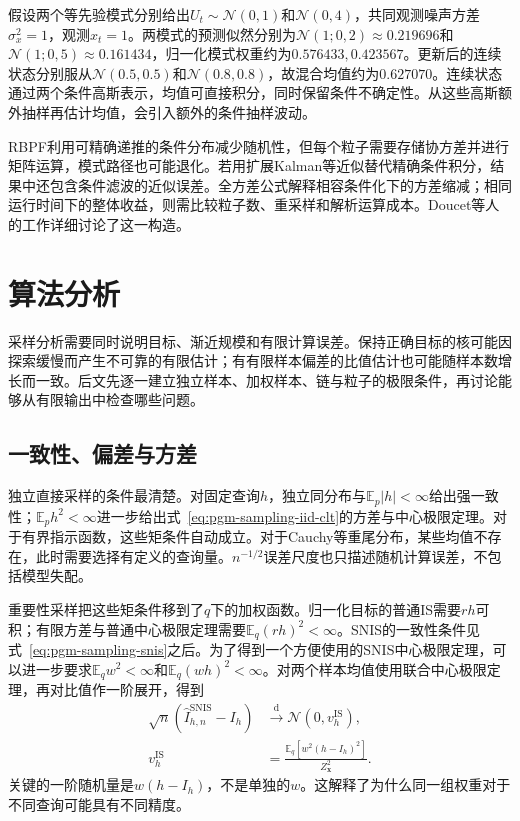 假设两个等先验模式分别给出$U_t\sim\mathcal{N}(0,1)$和$\mathcal{N}(0,4)$，共同观测噪声方差$\sigma_x^2=1$，观测$x_t=1$。两模式的预测似然分别为$\mathcal{N}(1;0,2)\approx0.219696$和$\mathcal{N}(1;0,5)\approx0.161434$，归一化模式权重约为$0.576433,0.423567$。更新后的连续状态分别服从$\mathcal{N}(0.5,0.5)$和$\mathcal{N}(0.8,0.8)$，故混合均值约为$0.627070$。连续状态通过两个条件高斯表示，均值可直接积分，同时保留条件不确定性。从这些高斯额外抽样再估计均值，会引入额外的条件抽样波动。

RBPF利用可精确递推的条件分布减少随机性，但每个粒子需要存储协方差并进行矩阵运算，模式路径也可能退化。若用扩展Kalman等近似替代精确条件积分，结果中还包含条件滤波的近似误差。全方差公式解释相容条件化下的方差缩减；相同运行时间下的整体收益，则需比较粒子数、重采样和解析运算成本。Doucet等人的工作详细讨论了这一构造。

\section{算法分析}
\label{sec:pgm-sampling-analysis}

采样分析需要同时说明目标、渐近规模和有限计算误差。保持正确目标的核可能因探索缓慢而产生不可靠的有限估计；有有限样本偏差的比值估计也可能随样本数增长而一致。后文先逐一建立独立样本、加权样本、链与粒子的极限条件，再讨论能够从有限输出中检查哪些问题。

\subsection{一致性、偏差与方差}
\label{sec:pgm-sampling-consistency}

独立直接采样的条件最清楚。对固定查询$h$，独立同分布与$\mathbb{E}_p|h|<\infty$给出强一致性；$\mathbb{E}_p h^2<\infty$进一步给出式~\eqref{eq:pgm-sampling-iid-clt}的方差与中心极限定理。对于有界指示函数，这些矩条件自动成立。对于Cauchy等重尾分布，某些均值不存在，此时需要选择有定义的查询量。$n^{-1/2}$误差尺度也只描述随机计算误差，不包括模型失配。

重要性采样把这些矩条件移到了$q$下的加权函数。归一化目标的普通IS需要$r h$可积；有限方差与普通中心极限定理需要$\mathbb{E}_q(rh)^2<\infty$。SNIS的一致性条件见式~\eqref{eq:pgm-sampling-snis}之后。为了得到一个方便使用的SNIS中心极限定理，可以进一步要求$\mathbb{E}_q w^2<\infty$和$\mathbb{E}_q(wh)^2<\infty$。对两个样本均值使用联合中心极限定理，再对比值作一阶展开，得到
\begin{equation}
  \begin{aligned}
    \sqrt n(\widehat I_{h,n}^{\mathrm{SNIS}}-I_h)
       &\xrightarrow{\mathrm{d}}\mathcal{N}(0,v_h^{\mathrm{IS}}),\\
    v_h^{\mathrm{IS}}
       &=\frac{\mathbb{E}_q[w^2(h-I_h)^2]}{Z_{\bm{x}}^2}.
  \end{aligned}
  \label{eq:pgm-sampling-snis-clt}
\end{equation}
关键的一阶随机量是$w(h-I_h)$，不是单独的$w$。这解释了为什么同一组权重对于不同查询可能具有不同精度。


